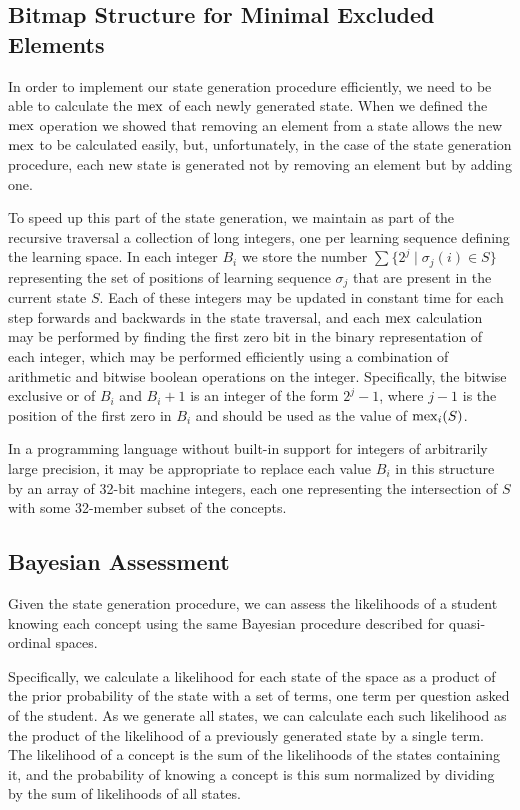 \documentclass[11pt]{llncs}
\begin{document}
{\subsection{Bitmap Structure for Minimal Excluded Elements}

In order to implement our state generation procedure efficiently, we need to be able to calculate the ${\rm mex}$ of each newly generated state. When we defined the ${\rm mex}$ operation we showed that removing an element from a state allows the new ${\rm mex}$ to be calculated easily, but, unfortunately, in the case of the state generation procedure, each new state is generated not by removing an element but by adding one.

To speed up this part of the state generation, we maintain as part of the recursive traversal a collection of long integers, one per learning sequence defining the learning space. In each integer $B_i$ we store the number $\sum\{2^j\mid\sigma_j(i)\in S\}$ representing the set of positions of learning sequence $\sigma_j$ that are present in the current state $S$. Each of these integers may be updated in constant time for each step forwards and backwards in the state traversal, and each ${\rm mex}$ calculation may be performed by finding the first zero bit in the binary representation of each integer,
which may be performed efficiently using a combination of arithmetic and bitwise boolean operations on the integer. Specifically, the bitwise exclusive or of $B_i$ and $B_i+1$ is an integer of the form $2^j-1$, where $j-1$ is the position of the first zero in $B_i$ and should be used as the value of ${\rm mex}_i(S)$.

In a programming language without built-in support for integers of arbitrarily large precision, it may be appropriate to replace each value $B_i$ in this structure by an array of 32-bit machine integers, each one representing the intersection of $S$ with some 32-member subset of the concepts.

\subsection{Bayesian Assessment}

Given the state generation procedure, we can assess the likelihoods of a student knowing each concept using the same Bayesian procedure described for quasi-ordinal spaces.

Specifically, we calculate a likelihood for each state of the space as a product of the prior probability of the state with a set of terms, one term per question asked of the student. As we generate all states, we can calculate each such likelihood as the product of the likelihood of a previously generated state by a single term. The likelihood of a concept is the sum of the likelihoods of the states containing it, and the probability of knowing a concept is this sum normalized by dividing by the sum of likelihoods of all states.

}
\end{document}
